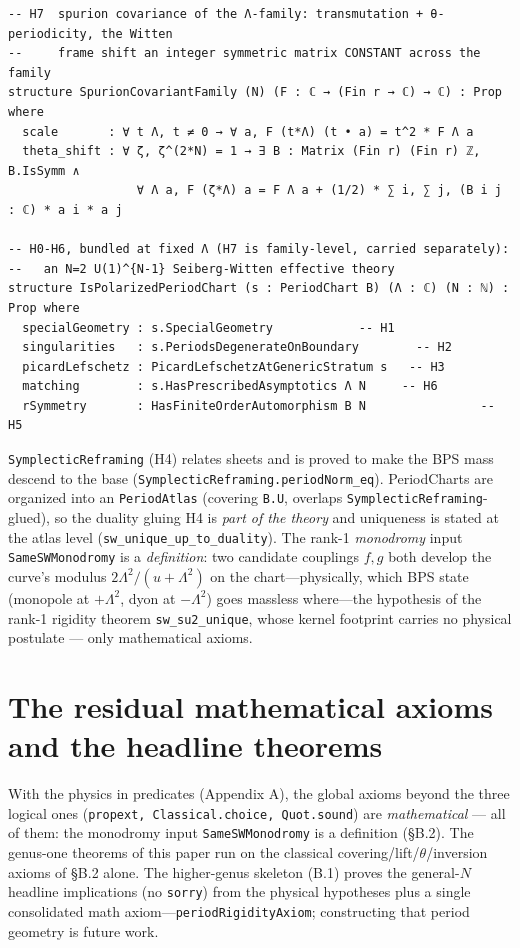 \documentclass{article}
\theoremstyle{plain}
\theoremstyle{definition}
\numberwithin{equation}{section}
\newcommand{\code}[1]{\texttt{#1}}
\begin{document}
\begin{Verbatim}
-- H7  spurion covariance of the Λ-family: transmutation + θ-periodicity, the Witten
--     frame shift an integer symmetric matrix CONSTANT across the family
structure SpurionCovariantFamily (N) (F : ℂ → (Fin r → ℂ) → ℂ) : Prop where
  scale       : ∀ t Λ, t ≠ 0 → ∀ a, F (t*Λ) (t • a) = t^2 * F Λ a
  theta_shift : ∀ ζ, ζ^(2*N) = 1 → ∃ B : Matrix (Fin r) (Fin r) ℤ, B.IsSymm ∧
                  ∀ Λ a, F (ζ*Λ) a = F Λ a + (1/2) * ∑ i, ∑ j, (B i j : ℂ) * a i * a j

-- H0-H6, bundled at fixed Λ (H7 is family-level, carried separately):
--   an N=2 U(1)^{N-1} Seiberg-Witten effective theory
structure IsPolarizedPeriodChart (s : PeriodChart B) (Λ : ℂ) (N : ℕ) : Prop where
  specialGeometry : s.SpecialGeometry            -- H1
  singularities   : s.PeriodsDegenerateOnBoundary        -- H2
  picardLefschetz : PicardLefschetzAtGenericStratum s   -- H3
  matching        : s.HasPrescribedAsymptotics Λ N     -- H6
  rSymmetry       : HasFiniteOrderAutomorphism B N                -- H5
\end{Verbatim}

\noindent \code{SymplecticReframing} (H4) relates sheets and is proved to make the BPS mass descend to the
base (\code{SymplecticReframing.periodNorm\_eq}). PeriodCharts are organized into an \code{PeriodAtlas} (covering \code{B.U},
overlaps \code{SymplecticReframing}-glued), so the duality gluing H4 is \emph{part of the theory} and uniqueness
is stated at the atlas level (\code{sw\_unique\_up\_to\_duality}). The rank-1 \emph{monodromy}
input \code{SameSWMonodromy} is a \emph{definition}: two
candidate couplings $f,g$ both develop the curve's modulus $2\Lambda^2/(u+\Lambda^2)$ on the
chart---physically, which BPS state (monopole at $+\Lambda^2$, dyon at $-\Lambda^2$) goes
massless where---the hypothesis of the rank-1 rigidity theorem \code{sw\_su2\_unique}, whose
kernel footprint carries no physical postulate --- only mathematical axioms.

\section{The residual mathematical axioms and the headline theorems}

With the physics in predicates (Appendix A), the global axioms beyond the three
logical ones (\code{propext, Classical.choice, Quot.sound}) are \emph{mathematical} --- all of
them: the monodromy input \code{SameSWMonodromy} is a definition
(\S B.2). The genus-one theorems of this paper run on the classical covering/lift/$\theta$/inversion
axioms of \S B.2 alone. The higher-genus skeleton (B.1) proves the general-$N$ headline
implications (no \code{sorry}) from the physical hypotheses plus a single consolidated math
axiom---\code{periodRigidityAxiom}; constructing that period geometry is future work.
\end{document}
